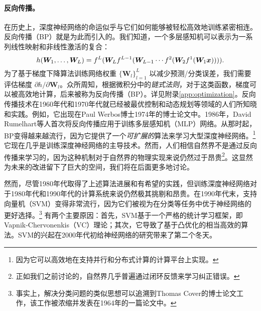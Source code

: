 \documentclass[../../book-main.tex]{subfiles}
\begin{document}
\paragraph{反向传播。}
在历史上，深度神经网络的命运似乎与它们如何能够被轻松高效地训练紧密相连。反向传播（BP）就是为此而引入的。我们知道，一个多层感知机可以表示为一系列线性映射和非线性激活的复合：
\begin{equation}
h(\bm W_1, \ldots, \bm W_L) = f^L(\bm W_Lf^{L-1}(\bm W_{L-1} \cdots f^2(\bm W_2f^1(\bm W_1\bm{x})))).
\end{equation}
为了基于梯度下降算法训练网络权重 $\{\bm W_l\}_{l=1}^L$ 以减少预测/分类误差，我们需要评估梯度 ${\partial h}/{\partial \bm W_l}$。众所周知，根据微积分中的{\em 链式法则}，对于这类函数，梯度可以被高效地计算，后来被称为反向传播（BP）。详见附录\ref{app:optimization}。反向传播技术在1960年代和1970年代就已经被最优控制和动态规划等领域的人们所知晓和实践。例如，它出现在Paul Werbos博士1974年的博士论文中\cite{Werbos-1974, Werbos1994TheRO}。1986年，David Rumelhart等人首次将反向传播应用于训练多层感知机（MLP）网络\cite{Rumelhart1986}。从那时起，BP变得越来越流行，因为它提供了一个{\em 可扩展的}算法来学习大型深度神经网络。\footnote{因为它可以高效地在支持并行和分布式计算的计算平台上实现。} 它现在几乎是训练深度神经网络的主导技术。然而，人们相信自然界不是通过反向传播来学习的，因为这种机制对于自然界的物理实现来说仍然过于昂贵\footnote{正如我们之前讨论的，自然界几乎普遍通过闭环反馈来学习纠正错误。}。这显然为未来的改进留下了巨大的空间，我们将在后面更多地讨论。

然而，尽管1980年代取得了上述算法进展和有希望的实践，但训练深度神经网络对于1980年代和1990年代的计算系统来说仍然极其挑剔和昂贵。在1990年代末，支持向量机（SVM）\cite{SVM-1995}变得非常流行，因为它们被视为在分类等任务中优于神经网络的更好选择。\footnote{事实上，解决分类问题的类似思想可以追溯到Thomas Cover的博士论文工作，该工作被浓缩并发表在1964年的一篇论文中\cite{Cover-1964}。} 有两个主要原因：首先，SVM基于一个严格的统计学习框架，即Vapnik-Chervonenkis（VC）理论；其次，它导致了基于凸优化\cite{BoydVa04}的相当高效的算法。SVM的兴起在2000年代初给神经网络的研究带来了第二个冬天。
\end{document}
